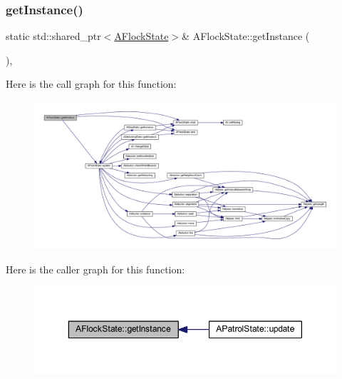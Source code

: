 \subsubsection{\texorpdfstring{get\+Instance()}{getInstance()}}
{\footnotesize\ttfamily static std\+::shared\+\_\+ptr$<$\hyperlink{class_a_flock_state}{A\+Flock\+State}$>$\& A\+Flock\+State\+::get\+Instance (\begin{DoxyParamCaption}{ }\end{DoxyParamCaption})\hspace{0.3cm}{\ttfamily [inline]}, {\ttfamily [static]}}

Here is the call graph for this function\+:
\nopagebreak
\begin{figure}[H]
\begin{center}
\leavevmode
\includegraphics[width=350pt]{class_a_flock_state_a838c2fa41a3ff8c863f4bcfe80637c4d_cgraph}
\end{center}
\end{figure}
Here is the caller graph for this function\+:
\nopagebreak
\begin{figure}[H]
\begin{center}
\leavevmode
\includegraphics[width=350pt]{class_a_flock_state_a838c2fa41a3ff8c863f4bcfe80637c4d_icgraph}
\end{center}
\end{figure}
\mbox{\label{class_a_flock_state_a375255af2422bad8037325ea8ff86ddb}} 

